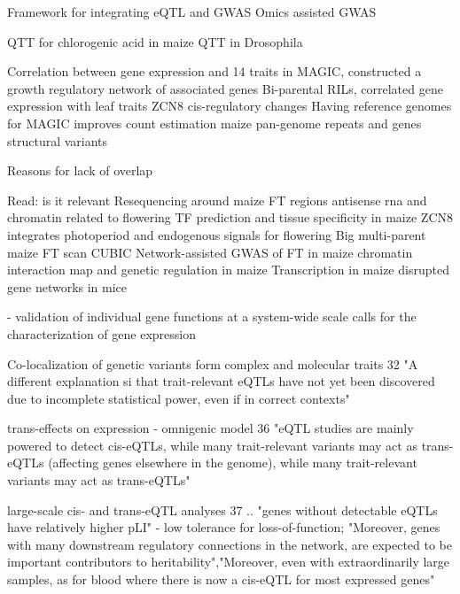 \documentclass[article,9pt,twocolumn,twoside]{rilabRxiv}
\begin{document}
\cite{Xu} Framework for integrating eQTL and GWAS
\cite{Zhang1} Omics assisted GWAS

\cite{Joet} QTT for chlorogenic acid in maize
\cite{PassadorGurgel} QTT in Drosophila

\cite{Baute} Correlation between gene expression and 14 traits in MAGIC, constructed a growth regulatory network of associated genes
\cite{Baute2} Bi-parental RILs, correlated gene expression with leaf traits
\cite{Guo} ZCN8 cis-regulatory changes
\cite{Munger} Having reference genomes for MAGIC improves count estimation
\cite{Haberer} maize pan-genome repeats and genes
\cite{Chakraborty} structural variants



\cite{Mostafavi} Reasons for lack of overlap


Read: is it relevant
\cite{Jamann} Resequencing around maize FT regions
\cite{Ietswaart} antisense rna and chromatin related to flowering
\cite{Jiang2} TF prediction and tissue specificity in maize
\cite{Lazakis} ZCN8 integrates photoperiod and endogenous signals for flowering
\cite{Li4} Big multi-parent maize FT scan
\cite{Liu2} CUBIC
\cite{Maldonado} Network-assisted GWAS of FT in maize
\cite{Peng} chromatin interaction map and genetic regulation in maize
\cite{Wang2,Wang3} Transcription in maize
\cite{Morgan} disrupted gene networks in mice


\citep{Krouk} - validation of individual gene functions at a system-wide scale calls for the characterization of gene expression 

\cite{Hukku} Co-localization of genetic variants form complex and molecular traits 32 "A different explanation si that trait-relevant eQTLs have not yet been discovered due to incomplete statistical power, even if in correct contexts" 

\cite{Liu5} trans-effects on expression - omnigenic model 36 "eQTL studies are mainly powered to detect cis-eQTLs, while many trait-relevant variants may act as trans-eQTLs (affecting genes elsewhere in the genome), while many trait-relevant variants may act as trans-eQTLs"

\cite{Vosa} large-scale cis- and trans-eQTL analyses 37 .. "genes without detectable eQTLs have relatively higher pLI" - low tolerance for loss-of-function; "Moreover, genes with many downstream regulatory connections in the network, are expected to be important contributors to heritability","Moreover, even with extraordinarily large samples, as for blood where there is now a cis-eQTL for most expressed genes"
\end{document}
